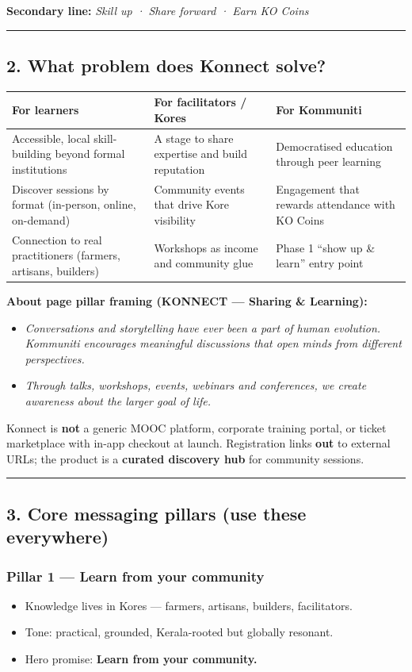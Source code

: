 \documentclass[11pt,a4paper]{report}
\begin{document}
\textbf{Secondary line:} \textit{Skill up · Share forward · Earn KO Coins}


\medskip\hrule\medskip

\subsection{2. What problem does Konnect solve?}

\begin{longtable}{|l|l|l|}
\hline
For learners & For facilitators / Kores & For Kommuniti \\ \hline
Accessible, local skill-building beyond formal institutions & A stage to share expertise and build reputation & Democratised education through peer learning \\ \hline
Discover sessions by format (in-person, online, on-demand) & Community events that drive Kore visibility & Engagement that rewards attendance with KO Coins \\ \hline
Connection to real practitioners (farmers, artisans, builders) & Workshops as income and community glue & Phase 1 “show up \& learn” entry point \\
\hline
\end{longtable}


\textbf{About page pillar framing (KONNECT --- Sharing \& Learning):}

\begin{itemize}
  \item \textit{Conversations and storytelling have ever been a part of human evolution. Kommuniti encourages meaningful discussions that open minds from different perspectives.}
  \item \textit{Through talks, workshops, events, webinars and conferences, we create awareness about the larger goal of life.}
\end{itemize}

Konnect is \textbf{not} a generic MOOC platform, corporate training portal, or ticket marketplace with in-app checkout at launch. Registration links \textbf{out} to external URLs; the product is a \textbf{curated discovery hub} for community sessions.


\medskip\hrule\medskip

\subsection{3. Core messaging pillars (use these everywhere)}

\subsubsection{Pillar 1 --- Learn from your community}
\begin{itemize}
  \item Knowledge lives in Kores --- farmers, artisans, builders, facilitators.
  \item Tone: practical, grounded, Kerala-rooted but globally resonant.
  \item Hero promise: \textbf{Learn from your community.}
\end{itemize}
\end{document}
